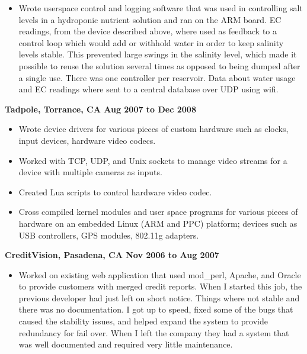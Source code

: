 \documentclass{res}
\begin{document}
\begin{resume}
\begin{itemize}
\item
	Wrote userspace control and logging software that was used in
	controlling salt levels in a hydroponic nutrient solution and
	ran on the ARM board.  EC readings, from the device described
	above, where used as feedback to a control loop which would add
	or withhold water in order to keep salinity levels stable.
	This prevented large swings in the salinity level, which made
	it possible to reuse the solution several times as opposed to
	being dumped after a single use.  There was one controller per
	reservoir.  Data about water usage and EC readings where sent
	to a central database over UDP using wifi.


\end{itemize}

{\large \bf Tadpole, Torrance, CA \hfill Aug 2007 to Dec 2008}

\begin{itemize}

\item
	Wrote device drivers for various pieces of custom hardware such
	as clocks, input devices, hardware video codecs.

\item
	Worked with TCP, UDP, and Unix sockets to manage video streams
	for a device with multiple cameras as inputs.

\item
	Created Lua scripts to control hardware video codec.

\item
	Cross compiled kernel modules and user space programs for various
	pieces of hardware on an embedded Linux (ARM and PPC) platform;
	devices such as USB controllers, GPS modules, 802.11g adapters.

\end{itemize}

{\large \bf CreditVision, Pasadena, CA \hfill Nov 2006 to Aug 2007}

\begin{itemize}

\item
	Worked on existing web application that used mod\_perl, Apache,
	and Oracle to provide customers with merged credit reports.
	When I started this job, the previous developer had just
	left on short notice.  Things where not stable and there was
	no documentation.  I got up to speed, fixed some of the bugs
	that caused the stability issues, and helped expand the system
	to provide redundancy for fail over.  When I left the company
	they had a system that was well documented and required very
	little maintenance.


\end{itemize}
\end{resume}
\end{document}
